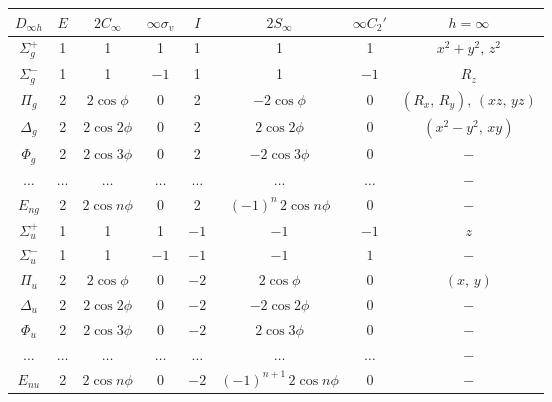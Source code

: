 \begin{center}
\begin{tabular}{ |c|c|c|c|c|c|c|c| }
 \hline
 $D_{\infty h}$ & $E$ & $2C_{\infty}$ & $\infty\sigma_v$ & $I$ & $2S_\infty$ & $\infty C_2'$ & $h=\infty$ \\ 
 \hline
 $\Sigma^+_g$ & 1 & 1 & 1 & 1 & 1 & 1 & $x^2+y^2,\,z^2$ \\  
 \hline
 $\Sigma^-_g$ & 1 & 1 & $-1$ & 1 & 1 & $-1$ & $R_z$ \\
 \hline
 $\Pi_g$ & 2 & $2\cos{\phi}$ & $0$ & 2 & $-2\cos{\phi}$ & $0$ & $(R_x,\,R_y),\,(xz,\,yz)$ \\
 \hline
 $\Delta_g$ & 2 & $2\cos{2\phi}$ & $0$ & 2 & $2\cos{2\phi}$ & $0$ & $(x^2-y^2,\,xy)$ \\
 \hline
 $\Phi_g$ & 2 & $2\cos{3\phi}$ & $0$ & 2 & $-2\cos{3\phi}$ & $0$ & $-$ \\
 \hline
 $\ldots$ & $\ldots$ & $\ldots$ & $\ldots$ & $\ldots$ & $\ldots$ & $\ldots$ & $-$ \\
 \hline
 $E_{ng}$ & 2 & $2\cos{n\phi}$ & $0$ & 2 & $(-1)^n\,2\cos{n\phi}$ & $0$ & $-$ \\
 \hline
 $\Sigma^+_u$ & 1 & 1 & 1 & $-1$ & $-1$ & $-1$ & $z$ \\  
 \hline
 $\Sigma^-_u$ & 1 & 1 & $-1$ & $-1$ & $-1$ & $1$ & $-$ \\
 \hline
 $\Pi_u$ & 2 & $2\cos{\phi}$ & $0$ & $-2$ & $2\cos{\phi}$ & $0$ & $(x,\,y)$ \\
 \hline
 $\Delta_u$ & 2 & $2\cos{2\phi}$ & $0$ & $-2$ & $-2\cos{2\phi}$ & $0$ & $-$ \\
 \hline
 $\Phi_u$ & 2 & $2\cos{3\phi}$ & $0$ & $-2$ & $2\cos{3\phi}$ & $0$ & $-$ \\
 \hline
 $\ldots$ & $\ldots$ & $\ldots$ & $\ldots$ & $\ldots$ & $\ldots$ & $\ldots$ & $-$ \\
 \hline
 $E_{nu}$ & 2 & $2\cos{n\phi}$ & $0$ & $-2$ & $(-1)^{n+1}\,2\cos{n\phi}$ & $0$ & $-$ \\
 \hline
\end{tabular}
\end{center}

